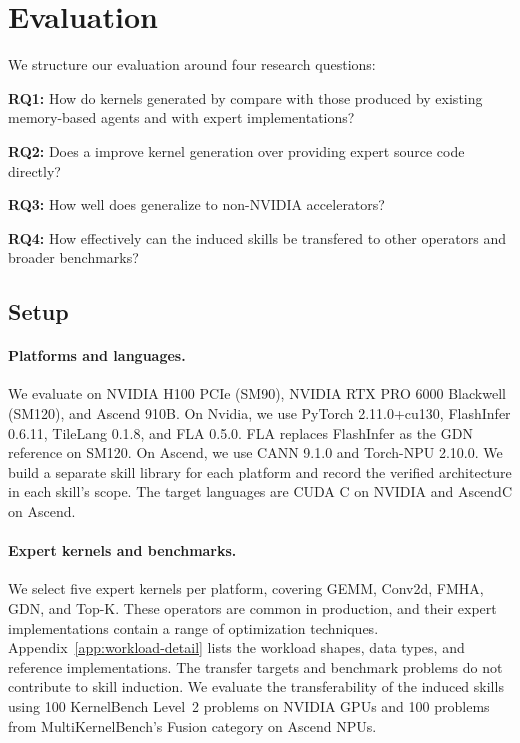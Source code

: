 \section{Evaluation}
\label{sec:experiments}

We structure our evaluation around four research questions:

\noindent\textbf{RQ1:} How do kernels generated by \sys{} compare with
those produced by existing memory-based agents and with expert
implementations?

\noindent\textbf{RQ2:} Does a \sys improve kernel generation over providing expert source code directly?

\noindent\textbf{RQ3:} How well does \sys{} generalize to non-NVIDIA accelerators?

\noindent\textbf{RQ4:} How effectively can the induced skills be transfered to other operators and broader benchmarks?

\subsection{Setup}
\label{sec:exp-setup}

\paragraph{Platforms and languages.}
We evaluate on NVIDIA H100 PCIe (SM90), NVIDIA RTX PRO 6000 Blackwell (SM120), and Ascend 910B. On Nvidia, we use PyTorch 2.11.0+cu130, FlashInfer 0.6.11, TileLang 0.1.8, and FLA 0.5.0. FLA replaces FlashInfer as the GDN reference on SM120. On Ascend, we use CANN 9.1.0 and Torch-NPU 2.10.0. We build a separate skill library for each platform and record the verified architecture in each skill's scope. The target languages are CUDA C on NVIDIA and AscendC on Ascend.

\paragraph{Expert kernels and benchmarks.}
We select five expert kernels per platform, covering GEMM, Conv2d, FMHA, GDN, and Top-K. These operators are common in production, and their expert implementations contain a range of optimization techniques. Appendix~\ref{app:workload-detail} lists the workload shapes, data types, and reference implementations. The transfer targets and benchmark problems do not contribute to skill induction. We evaluate the transferability of the induced skills using 100 KernelBench Level~2 problems on NVIDIA GPUs and 100 problems from MultiKernelBench's Fusion category on Ascend NPUs.

